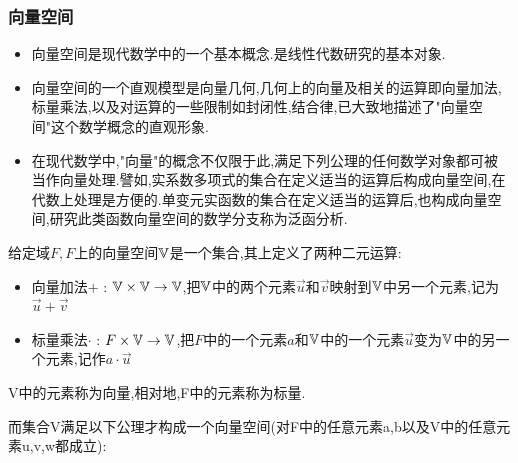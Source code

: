 {{      \subsubsection{向量空间}{
          \begin{itemize}
              \item 向量空间是现代数学中的一个基本概念.是线性代数研究的基本对象.
              \item 向量空间的一个直观模型是向量几何,几何上的向量及相关的运算即向量加法,标量乘法,以及对运算的一些限制如封闭性,结合律,已大致地描述了"向量空间"这个数学概念的直观形象.
              \item 在现代数学中,"向量"的概念不仅限于此,满足下列公理的任何数学对象都可被当作向量处理.譬如,实系数多项式的集合在定义适当的运算后构成向量空间,在代数上处理是方便的.单变元实函数的集合在定义适当的运算后,也构成向量空间,研究此类函数向量空间的数学分支称为泛函分析.
          \end{itemize}

          给定域$F,F$上的向量空间$\mathbb{V}$是一个集合,其上定义了两种二元运算:

          \begin{itemize}
              \item 向量加法$+$ : $\mathbb{V} \times \mathbb{V} \to \mathbb{V}$,把$\mathbb{V}$中的两个元素$\vec{u}$和$\vec{v}$映射到$\mathbb{V}$中另一个元素,记为$\vec{u} + \vec{v}$
              \item 标量乘法$\cdot$ : $F \times \mathbb{V} \to \mathbb{V}$,把$F$中的一个元素$a$和$\mathbb{V}$中的一个元素$\vec{u}$变为$\mathbb{V}$中的另一个元素,记作$a \cdot \vec{u}$
          \end{itemize}

          V中的元素称为向量,相对地,F中的元素称为标量.

          而集合V满足以下公理才构成一个向量空间(对F中的任意元素a,b以及V中的任意元素u,v,w都成立):

}}}
